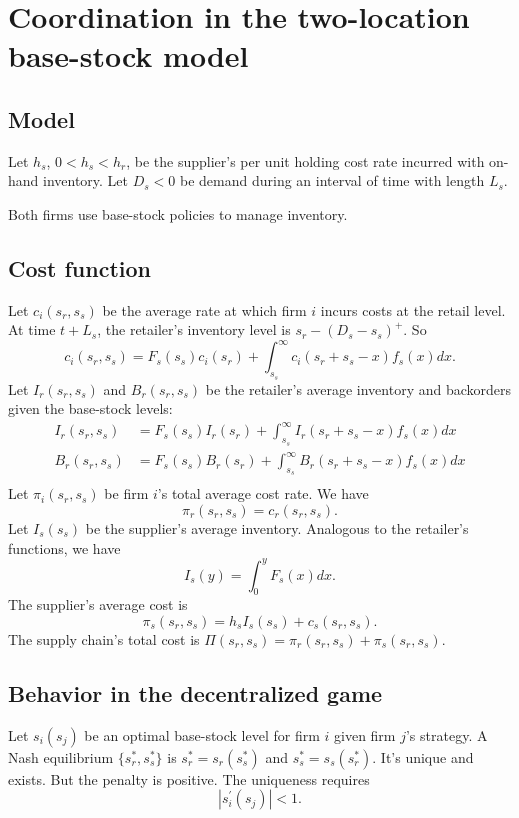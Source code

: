 \newpage
\section{Coordination in the two-location base-stock model}
\subsection{Model}
Let $h_s$, $0<h_s<h_r$, be the supplier's per unit holding cost rate incurred with on-hand inventory. Let $D_s<0$ be demand during an interval of time with length $L_s$. 

Both firms use base-stock policies to manage inventory.

\subsection{Cost function}
Let $c_i(s_r,s_s)$ be the average rate at which firm $i$ incurs costs at the retail level. 
At time $t+L_s$, the retailer's inventory level is $s_r-\left(D_s-s_s\right)^+$. So
\begin{equation*}
    c_i(s_r,s_s)=F_s(s_s)c_i(s_r)+\int_{s_s}^\infty c_i(s_r+s_s-x)f_s(x)dx.
\end{equation*}
Let $I_r(s_r,s_s)$ and $B_r(s_r,s_s)$ be the retailer's average inventory and backorders given the base-stock levels:
\begin{align*}
    I_r(s_r,s_s)&=F_s(s_s)I_r(s_r)+\int_{s_s}^\infty I_r(s_r+s_s-x)f_s(x)dx\\
    B_r(s_r,s_s)&=F_s(s_s)B_r(s_r)+\int_{s_s}^\infty B_r(s_r+s_s-x)f_s(x)dx\\
\end{align*}
Let $\pi_i(s_r,s_s)$ be firm $i$'s total average cost rate. We have 
$$\pi_r(s_r,s_s)=c_r(s_r,s_s).$$
Let $I_s(s_s)$ be the supplier's average inventory. Analogous to the retailer's functions, we have 
$$I_s(y)=\int_0^y F_s(x)dx.$$
The supplier's average cost is 
$$\pi_s(s_r,s_s)=h_s I_s(s_s)+c_s(s_r,s_s).$$
The supply chain's total cost is $\Pi(s_r,s_s)=\pi_r(s_r,s_s)+\pi_s(s_r,s_s)$.

\subsection{Behavior in the decentralized game}
Let $s_i(s_j)$ be an optimal base-stock level for firm $i$ given firm $j$'s strategy. 
A Nash equilibrium $\{s_r^*,s_s^*\}$ is $s_r^*=s_r (s_s^*)$ and $s_s^*=s_s(s_r^*)$. It's unique and exists. But the penalty is positive. The uniqueness requires
\begin{equation}
    |s_i^\prime(s_j)|<1.
\end{equation}


